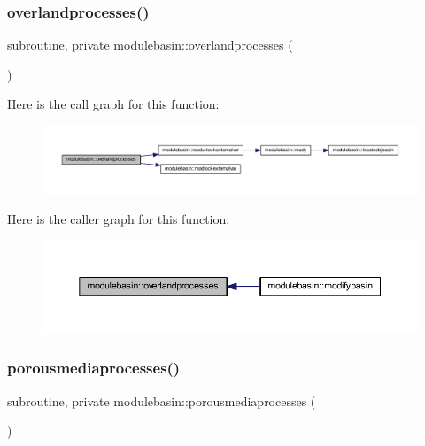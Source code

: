 \subsubsection{\texorpdfstring{overlandprocesses()}{overlandprocesses()}}
{\footnotesize\ttfamily subroutine, private modulebasin\+::overlandprocesses (\begin{DoxyParamCaption}{ }\end{DoxyParamCaption})\hspace{0.3cm}{\ttfamily [private]}}

Here is the call graph for this function\+:\nopagebreak
\begin{figure}[H]
\begin{center}
\leavevmode
\includegraphics[width=350pt]{namespacemodulebasin_a4732062e95bfb4656920c8c89a412510_cgraph}
\end{center}
\end{figure}
Here is the caller graph for this function\+:\nopagebreak
\begin{figure}[H]
\begin{center}
\leavevmode
\includegraphics[width=350pt]{namespacemodulebasin_a4732062e95bfb4656920c8c89a412510_icgraph}
\end{center}
\end{figure}
\mbox{\label{namespacemodulebasin_aea9e156b76b5f88b91a7c975b33694ac}} 
\subsubsection{\texorpdfstring{porousmediaprocesses()}{porousmediaprocesses()}}
{\footnotesize\ttfamily subroutine, private modulebasin\+::porousmediaprocesses (\begin{DoxyParamCaption}{ }\end{DoxyParamCaption})\hspace{0.3cm}{\ttfamily [private]}}

